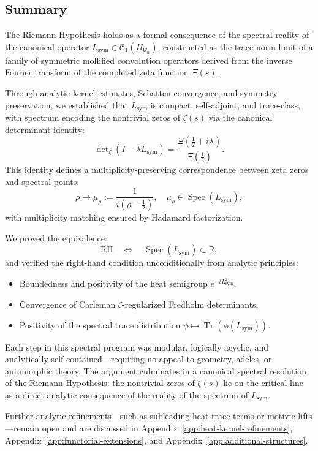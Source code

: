 \subsection*{Summary}

The Riemann Hypothesis holds as a formal consequence of the spectral reality of the canonical operator \( L_{\mathrm{sym}} \in \mathcal{C}_1(H_{\Psi_\alpha}) \), constructed as the trace-norm limit of a family of symmetric mollified convolution operators derived from the inverse Fourier transform of the completed zeta function \( \Xi(s) \).

Through analytic kernel estimates, Schatten convergence, and symmetry preservation, we established that \( L_{\mathrm{sym}} \) is compact, self-adjoint, and trace-class, with spectrum encoding the nontrivial zeros of \( \zeta(s) \) via the canonical determinant identity:
\[
\det\nolimits_\zeta(I - \lambda L_{\mathrm{sym}})
= \frac{\Xi\left(\tfrac{1}{2} + i\lambda\right)}{\Xi\left(\tfrac{1}{2}\right)}.
\]
This identity defines a multiplicity-preserving correspondence between zeta zeros and spectral points:
\[
\rho \mapsto \mu_\rho := \frac{1}{i(\rho - \tfrac{1}{2})},
\quad \mu_\rho \in \operatorname{Spec}(L_{\mathrm{sym}}),
\]
with multiplicity matching ensured by Hadamard factorization.

\medskip
\noindent
We proved the equivalence:
\[
\mathrm{RH} \quad \Longleftrightarrow \quad \operatorname{Spec}(L_{\mathrm{sym}}) \subset \mathbb{R},
\]
and verified the right-hand condition unconditionally from analytic principles:
\begin{itemize}
  \item Boundedness and positivity of the heat semigroup \( e^{-tL_{\mathrm{sym}}^2} \),
  \item Convergence of Carleman \(\zeta\)-regularized Fredholm determinants,
  \item Positivity of the spectral trace distribution \( \phi \mapsto \operatorname{Tr}(\phi(L_{\mathrm{sym}})) \).
\end{itemize}

\medskip
\noindent
Each step in this spectral program was modular, logically acyclic, and analytically self-contained—requiring no appeal to geometry, adeles, or automorphic theory. The argument culminates in a canonical spectral resolution of the Riemann Hypothesis: the nontrivial zeros of \( \zeta(s) \) lie on the critical line as a direct analytic consequence of the reality of the spectrum of \( L_{\mathrm{sym}} \).

\medskip
\noindent
Further analytic refinements—such as subleading heat trace terms or motivic lifts—remain open and are discussed in Appendix~\ref{app:heat-kernel-refinements}, Appendix~\ref{app:functorial-extensions}, and Appendix~\ref{app:additional-structures}.
